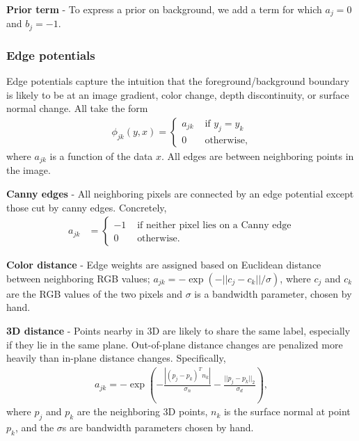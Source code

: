 \documentclass[graybox]{svmult}
\begin{document}
\textbf{Prior term} - To express a prior on background, we add a term for which $a_j = 0$ and $b_j = -1$.

\pagebreak 
\subsubsection{Edge potentials}

Edge potentials capture the intuition that the foreground/background boundary is likely to be at an image gradient, color change, depth discontinuity, or surface normal change.  All take the form
\begin{align*}
  \phi_{jk}(y, x) =
  \left\{
  \begin{array}{rl}
    a_{jk} & \mbox{ if } y_j = y_k \\
    0 & \mbox{ otherwise,}
  \end{array}
  \right.
\end{align*}
where $a_{jk}$ is a function of the data $x$.  All edges are between neighboring points in the image.

\textbf{Canny edges} - All neighboring pixels are connected by an edge potential except those cut by canny edges.  Concretely,
\begin{align*}
  a_{jk} & =
  \left\{
  \begin{array}{rl}
    -1 & \mbox{ if neither pixel lies on a Canny edge} \\
    0 & \mbox{ otherwise.}
  \end{array}
  \right.
\end{align*}


\textbf{Color distance} - Edge weights are assigned based on Euclidean distance between neighboring RGB values; $a_{jk} = - \exp(-||c_j - c_k|| / \sigma)$, where $c_j$ and $c_k$ are the RGB values of the two pixels and $\sigma$ is a bandwidth parameter, chosen by hand.

\textbf{3D distance} - Points nearby in 3D are likely to share the same label, especially if they lie in the same plane.  Out-of-plane distance changes are penalized more heavily than in-plane distance changes.  Specifically,
\begin{align*}
  a_{jk} = -\exp \left( -\frac{|(p_j - p_k)^T n_k|}{\sigma_n} - \frac{||p_j - p_k||_2}{\sigma_d} \right),
\end{align*}
where $p_j$ and $p_k$ are the neighboring 3D points, $n_k$ is the surface normal at point $p_k$, and the $\sigma$s are bandwidth parameters chosen by hand.
\end{document}
